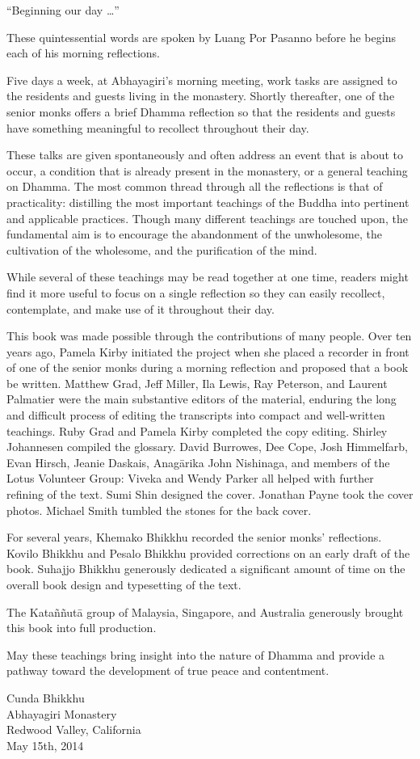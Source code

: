 ``Beginning our day \ldots{}''

These quintessential words are spoken by Luang Por Pasanno before he 
begins each of his morning reflections.

Five days a week, at Abhayagiri's morning meeting, work tasks are 
assigned to the residents and guests living in the monastery. Shortly 
thereafter, one of the senior monks offers a brief Dhamma reflection so 
that the residents and guests have something meaningful to recollect 
throughout their day.

These talks are given spontaneously and often address an event that is 
about to occur, a condition that is already present in the monastery, 
or a general teaching on Dhamma. The most common thread through all the 
reflections is that of practicality: distilling the most important 
teachings of the Buddha into pertinent and applicable practices. Though 
many different teachings are touched upon, the fundamental aim is to 
encourage the abandonment of the unwholesome, the cultivation of the 
wholesome, and the purification of the mind.

While several of these teachings may be read together at one time, 
readers might find it more useful to focus on a single reflection so 
they can easily recollect, contemplate, and make use of it throughout 
their day.

This book was made possible through the contributions of many people. 
Over ten years ago, Pamela Kirby initiated the project when she placed 
a recorder in front of one of the senior monks during a morning 
reflection and proposed that a book be written. Matthew Grad, Jeff 
Miller, Ila Lewis, Ray Peterson, and Laurent Palmatier were the main 
substantive editors of the material, enduring the long and difficult 
process of editing the transcripts into compact and well-written 
teachings. Ruby Grad and Pamela Kirby completed the copy editing. 
Shirley Johannesen compiled the glossary. David Burrowes, Dee Cope, 
Josh Himmelfarb, Evan Hirsch, Jeanie Daskais, Anagārika John 
Nishinaga, and members of the Lotus Volunteer Group: Viveka and Wendy 
Parker all helped with further refining of the text. Sumi Shin designed 
the cover. Jonathan Payne took the cover photos. Michael Smith tumbled 
the stones for the back cover.

For several years, Khemako Bhikkhu recorded the senior monks' 
reflections. Kovilo Bhikkhu and Pesalo Bhikkhu provided corrections on 
an early draft of the book. Suhajjo Bhikkhu generously dedicated a 
significant amount of time on the overall book design and typesetting 
of the text.

The Kataññutā group of Malaysia, Singapore, and Australia generously 
brought this book into full production.

May these teachings bring insight into the nature of Dhamma and provide 
a pathway toward the development of true peace and contentment.

\vspace{1.2em}

\noindent Cunda Bhikkhu\\
Abhayagiri Monastery\\
Redwood Valley, California\\
May 15th, 2014

